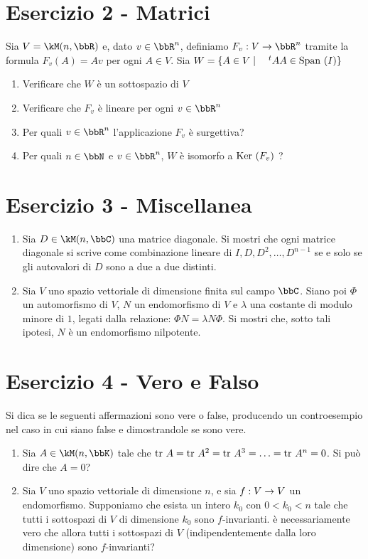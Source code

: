 \documentclass[a4paper,NoNotes,GeneralMath]{stdmdoc}
\begin{document}
	\section*{Esercizio 2 - Matrici}
	Sia $V = \kM(n,\bbR)$ e, dato $v\in\bbR^n$, definiamo $F_v: V \rar \bbR^n$ tramite la formula $F_v(A) = Av$ per ogni $A \in V$. Sia $W = \{A \in V \mid \quad {}^tA A\in \mbox{Span }(I)\}$
	\begin{enumerate}
		\item Verificare che $W$ è un sottospazio di $V$
		\item Verificare che $F_v$ è lineare per ogni $v\in\bbR^n$
		\item Per quali $v\in\bbR^n$ l'applicazione $F_v$ è surgettiva?
		\item Per quali $n\in\bbN$ e $v\in\bbR^n$, $W$ è isomorfo a $\mbox{Ker }(F_v)$ ?
	\end{enumerate}

	\section*{Esercizio 3 - Miscellanea}
	\begin{enumerate}
		\item Sia $D \in \kM(n,\bbC)$ una matrice diagonale. Si mostri che ogni matrice diagonale si scrive come combinazione lineare di $I, D, D^2, \ldots, D^{n-1}$ se e solo se gli autovalori di $D$ sono a due a due distinti.
		\item Sia $V$ uno spazio vettoriale di dimensione finita sul campo $\bbC$. Siano poi $\Phi$ un automorfismo di $V$, $N$ un endomorfismo di $V$ e $\lambda$ una costante di modulo minore di $1$, legati dalla relazione: $\Phi N = \lambda N \Phi$. Si mostri che, sotto tali ipotesi, $N$ è un endomorfismo nilpotente.
	\end{enumerate}
	
	\section*{Esercizio 4 - Vero e Falso}
	Si dica se le seguenti affermazioni sono vere o false, producendo un controesempio nel caso in cui siano false e dimostrandole se sono vere.
	\begin{enumerate}
		\item Sia $A \in \kM(n, \bbK)$ tale che $\mbox{tr } A = \mbox{tr } A^2 = \mbox{tr } A^3 = \ldots = \mbox{tr } A^n = 0$. Si può dire che $A = 0$?
		\item Sia $V$ uno spazio vettoriale di dimensione $n$, e sia $f: V \rightarrow V$ un endomorfismo. Supponiamo che esista un intero $k_0$ con $0 < k_0 < n$ tale che tutti i sottospazi di $V$ di dimensione $k_0$ sono $f$-invarianti. è necessariamente vero che allora tutti i sottospazi di $V$ (indipendentemente dalla loro dimensione) sono $f$-invarianti?
	\end{enumerate}
	
\end{document}
